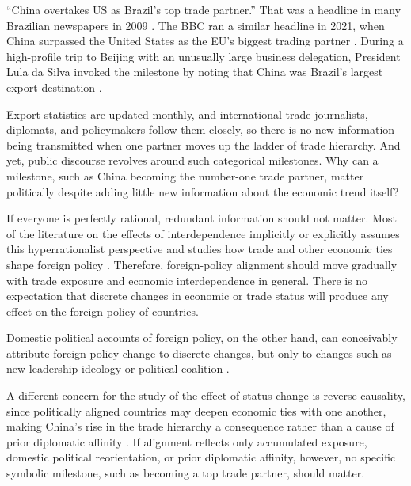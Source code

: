 \documentclass[referee,pdflatex,sn-basic]{sn-jnl}
\theoremstyle{thmstylethree}
\begin{document}
``China overtakes US as Brazil's top trade partner.'' That was a headline in many Brazilian newspapers in 2009 \citep{rodrigues2009}. The BBC ran a similar headline in 2021, when China surpassed the United States as the EU's biggest trading partner \citep{bbc2021}. During a high-profile trip to Beijing with an unusually large business delegation, President Lula da Silva invoked the milestone by noting that China was Brazil's largest export destination \citep{lula2009}.

Export statistics are updated monthly, and international trade journalists, diplomats, and policymakers follow them closely, so there is no new information being transmitted when one partner moves up the ladder of trade hierarchy. And yet, public discourse revolves around such categorical milestones. Why can a milestone, such as China becoming the number-one trade partner, matter politically despite adding little new information about the economic trend itself?

If everyone is perfectly rational, redundant information should not matter. Most of the literature on the effects of interdependence implicitly or explicitly assumes this hyperrationalist perspective and studies how trade and other economic ties shape foreign policy \citep{flores-macias_kreps2013, urdinez_etal2016, kastner_pearson2021}. Therefore, foreign-policy alignment should move gradually with trade exposure and economic interdependence in general. There is no expectation that discrete changes in economic or trade status will produce any effect on the foreign policy of countries.

Domestic political accounts of foreign policy, on the other hand, can conceivably attribute foreign-policy change to discrete changes, but only to changes such as new leadership ideology or political coalition \citep{neto2011, neto_malamud2015, rodrigues2019measuring, schenoniMythsMultipolaritySources2022}.

A different concern for the study of the effect of status change is reverse causality, since politically aligned countries may deepen economic ties with one another, making China's rise in the trade hierarchy a consequence rather than a cause of prior diplomatic affinity \citep{gowa1995, davis_pratt2021, struver2016}. If alignment reflects only accumulated exposure, domestic political reorientation, or prior diplomatic affinity, however, no specific symbolic milestone, such as becoming a top trade partner, should matter.
\end{document}
